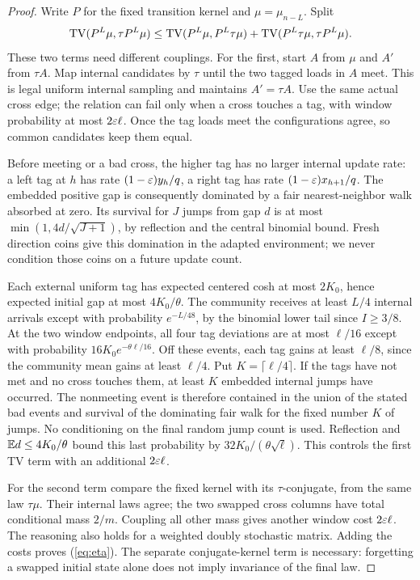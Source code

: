 \begin{proof}
Write $P$ for the fixed transition kernel and $\mu=\mu_{n-L}$. Split
\[
 \operatorname{TV}(P^L\mu,\tau P^L\mu)
 \le\operatorname{TV}(P^L\mu,P^L\tau\mu)+\operatorname{TV}(P^L\tau\mu,\tau P^L\mu).
\]
These two terms need different couplings. For the first, start $A$ from $\mu$ and $A'$ from $\tau A$. Map internal candidates by $\tau$ until the two tagged loads in $A$ meet. This is legal uniform internal sampling and maintains $A'=\tau A$. Use the same actual cross edge; the relation can fail only when a cross touches a tag, with window probability at most $2\varepsilon\ell$. Once the tag loads meet the configurations agree, so common candidates keep them equal.

Before meeting or a bad cross, the higher tag has no larger internal update rate: a left tag at $h$ has rate $(1-\varepsilon)y_h/q$, a right tag has rate $(1-\varepsilon)x_{h+1}/q$. The embedded positive gap is consequently dominated by a fair nearest-neighbor walk absorbed at zero. Its survival for $J$ jumps from gap $d$ is at most $\min(1,4d/\sqrt{J+1})$, by reflection and the central binomial bound. Fresh direction coins give this domination in the adapted environment; we never condition those coins on a future update count.

Each external uniform tag has expected centered cosh at most $2K_0$, hence expected initial gap at most $4K_0/\theta$. The community receives at least $L/4$ internal arrivals except with probability $e^{-L/48}$, by the binomial lower tail since $I\ge3/8$. At the two window endpoints, all four tag deviations are at most $\ell/16$ except with probability $16K_0e^{-\theta\ell/16}$. Off these events, each tag gains at least $\ell/8$, since the community mean gains at least $\ell/4$. Put $K=\lceil\ell/4\rceil$. If the tags have not met and no cross touches them, at least $K$ embedded internal jumps have occurred. The nonmeeting event is therefore contained in the union of the stated bad events and survival of the dominating fair walk for the fixed number $K$ of jumps. No conditioning on the final random jump count is used. Reflection and $\mathbb E d\le4K_0/\theta$ bound this last probability by $32K_0/(\theta\sqrt\ell)$. This controls the first TV term with an additional $2\varepsilon\ell$.

For the second term compare the fixed kernel with its $\tau$-conjugate, from the same law $\tau\mu$. Their internal laws agree; the two swapped cross columns have total conditional mass $2/m$. Coupling all other mass gives another window cost $2\varepsilon\ell$. The reasoning also holds for a weighted doubly stochastic matrix. Adding the costs proves (\ref*{eq:eta}). The separate conjugate-kernel term is necessary: forgetting a swapped initial state alone does not imply invariance of the final law.
\end{proof}
